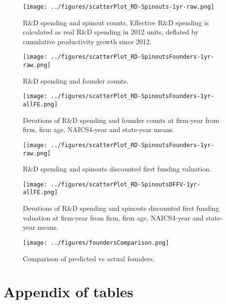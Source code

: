 \documentclass[12pt,english]{article}
\theoremstyle{remark}
\begin{document}
\begin{figure}[p]
	\centering
	\texttt{[image: ../figures/scatterPlot\_RD-Spinouts-1yr-raw.png]}
	\caption{R\&D spending and spinout counts. Effective R\&D spending is calculated as real R\&D spending in 2012 units, deflated by cumulative productivity growth since 2012.}
	\label{scatter_rd_spinoutcounts}
\end{figure}

\begin{figure}[p]
	\centering
	\texttt{[image: ../figures/scatterPlot\_RD-SpinoutsFounders-1yr-raw.png]}
	\caption{R\&D spending and founder counts.}
	\label{scatter_rd_foundercounts}
\end{figure}

\begin{figure}[p]
	\centering
	\texttt{[image: ../figures/scatterPlot\_RD-SpinoutsFounders-1yr-allFE.png]}
	\caption{Devations of R\&D spending and founder counts at firm-year from firm, firm age, NAICS4-year and state-year means.}
	\label{scatter_rd_foundercounts_d}
\end{figure}


\begin{figure}[p]
	\centering
	\texttt{[image: ../figures/scatterPlot\_RD-SpinoutsFounders-1yr-raw.png]}
	\caption{R\&D spending and spinouts discounted first funding valuation.}
	\label{scatter_rd_dffv}
\end{figure}


\begin{figure}[p]
	\centering
	\texttt{[image: ../figures/scatterPlot\_RD-SpinoutsDFFV-1yr-allFE.png]}
	\caption{Devations of R\&D spending and spinouts discounted first funding valuation at firm-year from firm, firm age, NAICS4-year and state-year means.}
	\label{scatter_rd_dffv_d}
\end{figure}

\begin{figure}[p]
	\centering
	\texttt{[image: ../figures/foundersComparison.png]}
	\caption{Comparison of predicted vs actual founders.}
	\label{foundersComparison}
\end{figure}

\break
\section{Appendix of tables}

\renewcommand\thefigure{\thesection.\arabic{figure}}  
\setcounter{figure}{0}
\end{document}
